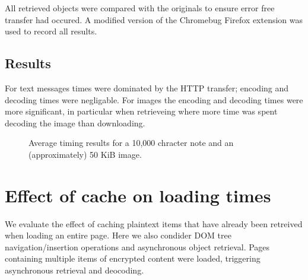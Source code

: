 All retrieved objects were compared with the originals to ensure error free transfer had occured. A modified version of the Chromebug Firefox extension was used to record all results.


\subsection{Results}

For text messages times were dominated by the HTTP transfer; encoding and decoding times were negligable. For images the encoding and decoding times were more significant, in particular when retrieveing where more time was spent decoding the image than downloading.

\begin{figure}[tbph]
    \begin{center}
    \caption{Average timing results for a 10,000 chracter note and an (approximately) 50 KiB image.}
    \label{graph:txt-sync}
  \end{center}
\end{figure}



\section{Effect of cache on loading times}

We evaluate the effect of caching plaintext items that have already been retreived when loading an entire page. Here we also condider DOM tree navigation/insertion operations and asynchronous object retrieval. Pages containing multiple items of encrypted content were loaded, triggering asynchronous retrieval and deocoding.


